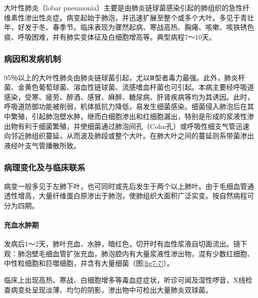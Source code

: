 大叶性肺炎（lobar
pneumonia）主要是由肺炎链球菌感染引起的肺组织的急性纤维素性渗出性炎症。病变起始于肺泡，并迅速扩展至整个或多个大叶。多见于青壮年，好发于冬、春季节。临床表现为骤然起病、寒战高热、胸痛、咳嗽、咳铁锈色痰、呼吸困难，并有肺实变体征及白细胞增高等。典型病程7～10天。

\subsubsection{病因和发病机制}

95％以上的大叶性肺炎由肺炎链球菌引起，尤以Ⅲ型者毒力最强。此外，肺炎杆菌、金黄色葡萄球菌、溶血性链球菌、流感嗜血杆菌也可引起。本病主要经呼吸道感染，受寒、疲劳、醉酒、感冒、麻醉、糖尿病、肝肾疾病等均为其诱因。此时，呼吸道防御功能被削弱，机体抵抗力降低，易发生细菌感染。细菌侵入肺泡后在其中繁殖，引起肺泡壁水肿，继而白细胞渗出和红细胞漏出，特别是形成的浆液性渗出物有利于细菌繁殖，并使细菌通过肺泡间孔（Cohn孔）或呼吸性细支气管迅速向邻近肺组织蔓延，从而波及肺段或整个大叶。在肺大叶之间的蔓延则系带菌渗出液经叶支气管播散所致。

\subsubsection{病理变化及与临床联系}

病变一般多见于左肺下叶，也可同时或先后发生于两个以上肺叶。由于毛细血管通透性增高，大量纤维蛋白原渗出于肺泡，使肺组织大面积广泛实变。按自然病程可分为四期。

\paragraph{充血水肿期}
发病后1～2天，肺叶充血、水肿，暗红色，切开时有血性浆液自切面流出。镜下观：肺泡壁毛细血管扩张充血，肺泡腔内有大量浆液性渗出物，混有少数红细胞、中性粒细胞和巨噬细胞，并含有大量细菌（图\ref{fig7-7}）。

临床上出现高热、寒战、白细胞增多等毒血症症状，听诊可闻及湿性啰音，X线检查病变处呈现淡薄、均匀的阴影，渗出物中可检出大量肺炎双球菌。

